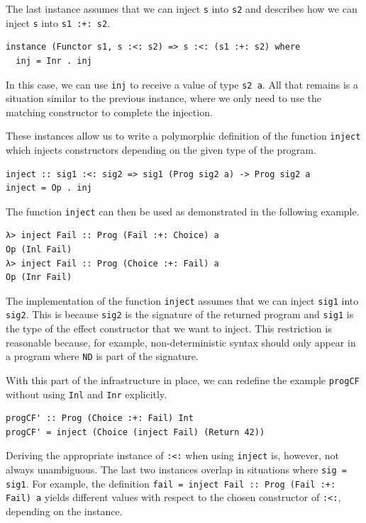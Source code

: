 \documentclass[a4paper, 11pt, fleqn, twoside, abstract=on]{scrreprt}
\newcommand{\hinl}[1]{\texttt{#1}}
\begin{document}
The last instance assumes that we can inject \hinl{s} into \hinl{s2} and describes how we can inject \hinl{s} into \hinl{s1 :+: s2}.

\begin{verbatim}
instance (Functor s1, s :<: s2) => s :<: (s1 :+: s2) where
  inj = Inr . inj
\end{verbatim}
\noindent
In this case, we can use \hinl{inj} to receive a value of type \hinl{s2 a}.
All that remains is a situation similar to the previous instance, where we only need to use the matching constructor to complete the injection.
 
These instances allow us to write a polymorphic definition of the function \hinl{inject} which injects constructors depending on the given type of the program.

\begin{verbatim}
inject :: sig1 :<: sig2 => sig1 (Prog sig2 a) -> Prog sig2 a
inject = Op . inj
\end{verbatim}
\noindent
The function \hinl{inject} can then be used as demonstrated in the following example.

\begin{verbatim}
λ> inject Fail :: Prog (Fail :+: Choice) a
Op (Inl Fail)
λ> inject Fail :: Prog (Choice :+: Fail) a
Op (Inr Fail)
\end{verbatim}

The implementation of the function \hinl{inject} assumes that we can inject \hinl{sig1} into \hinl{sig2}.
This is because \hinl{sig2} is the signature of the returned program and \hinl{sig1} is the type of the effect constructor that we want to inject.
This restriction is reasonable because, for example, non-deterministic syntax should only appear in a program where \hinl{ND} is part of the signature.

With this part of the infrastructure in place, we can redefine the example \hinl{progCF} without using \hinl{Inl} and \hinl{Inr} explicitly.

\begin{verbatim}
progCF' :: Prog (Choice :+: Fail) Int
progCF' = inject (Choice (inject Fail) (Return 42))
\end{verbatim}

Deriving the appropriate instance of \hinl{:<:} when using \hinl{inject} is, however, not always unambiguous.
The last two instances overlap in situations where \hinl{sig = sig1}.
For example, the definition \hinl{fail = inject Fail :: Prog (Fail :+: Fail) a} yields different values with respect to the chosen constructor of \hinl{:<:}, depending on the instance.
\end{document}
